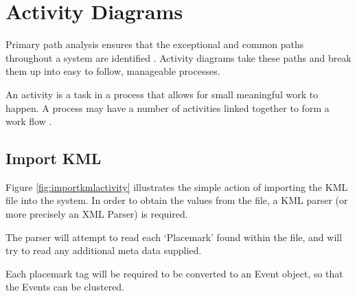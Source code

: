 \section{Activity Diagrams}

Primary path analysis ensures that the exceptional and common paths throughout 
a system are identified \citep{lunn03}. Activity diagrams take these paths and
break them up into easy to follow, manageable processes.

An activity is a task in a process that allows for small meaningful work to 
happen. A process may have a number of activities linked together to form a 
work flow \citep{lunn03}.

\subsection{Import KML}
Figure \ref{fig:importkmlactivity} illustrates the simple action of importing 
the KML file into the system. In order to obtain the values from the file, a 
KML parser (or more precisely an XML Parser) is required. 

The parser will attempt to read each `Placemark' found within the file, and 
will try to read any additional meta data supplied.

Each placemark tag will be required to be converted to an Event object, so that 
the Events can be clustered.

